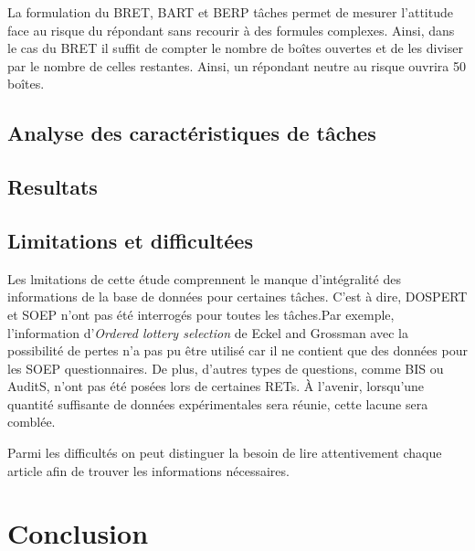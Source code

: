 \documentclass[12pt]{article}
\begin{document}
La formulation du BRET, BART et BERP tâches permet de mesurer l'attitude
face au risque du répondant sans recourir à des formules complexes.
Ainsi, dans le cas du BRET il suffit de compter le nombre de boîtes
ouvertes et de les diviser par le nombre de celles restantes. Ainsi, un
répondant neutre au risque ouvrira 50 boîtes.

\subsection{Analyse des caractéristiques de tâches}

\subsection{Resultats}

\subsection{Limitations et difficultées}

Les lmitations de cette étude comprennent le manque d'intégralité des
informations de la base de données pour certaines tâches. C'est à dire,
DOSPERT et SOEP n'ont pas été interrogés pour toutes les tâches.Par
exemple, l'information d'\emph{Ordered lottery selection} de Eckel and
Grossman avec la possibilité de pertes n'a pas pu être utilisé car il ne
contient que des données pour les SOEP questionnaires. De plus, d'autres
types de questions, comme BIS ou AuditS, n'ont pas été posées lors de
certaines RETs. À l'avenir, lorsqu'une quantité suffisante de données
expérimentales sera réunie, cette lacune sera comblée.

Parmi les difficultés on peut distinguer la besoin de lire attentivement
chaque article afin de trouver les informations nécessaires.

\section{Conclusion}

\label{sec:fifth}



\end{document}
